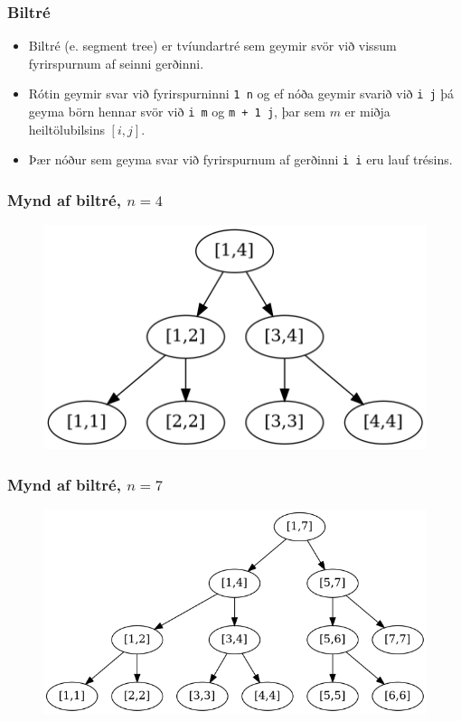 \documentclass[handout]{beamer}
\begin{document}
\begin{frame}
\frametitle{Biltré}
\begin{itemize}
\item<1-> Biltré (e. segment tree) er tvíundartré sem geymir svör við vissum fyrirspurnum af seinni gerðinni.
\item<2-> Rótin geymir svar við fyrirspurninni \texttt{1 n} 
og ef nóða geymir svarið við \texttt{i j} þá geyma börn hennar svör við \texttt{i m} og \texttt{m + 1 j}, þar sem $m$ er miðja heiltölubilsins $[i, j]$.
\item<3-> Þær nóður sem geyma svar við fyrirspurnum af gerðinni \texttt{i i} eru lauf trésins.
\end{itemize}
\end{frame}

\begin{frame}
\frametitle{Mynd af biltré, $n = 4$}
	\begin{figure}
		\includegraphics[scale=0.5]{mynd2.png}
	\end{figure}
\end{frame}

\begin{frame}
\frametitle{Mynd af biltré, $n = 7$}
	\begin{figure}
		\includegraphics[scale=0.3]{mynd3.png}
	\end{figure}
\end{frame}
\end{document}
